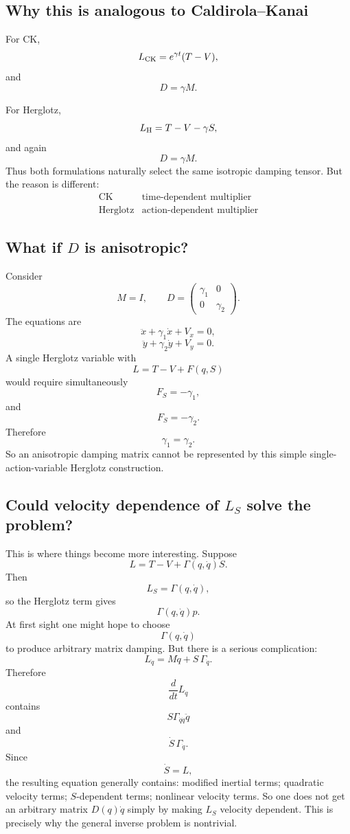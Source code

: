 \subsection{Why this is analogous to Caldirola–Kanai}

For CK,$$ L_{\rm CK} = e^{\gamma t}(T-V), $$
and $$ D=\gamma M. $$

For Herglotz,$$ L_{\rm H} = T-V-\gamma S, $$
and again 
$$ D=\gamma M. $$
Thus both formulations naturally select the same isotropic damping tensor.
But the reason is different:
$$ \boxed{ \begin{array}{c|c} 
\text{CK}& \text{time-dependent multiplier}\\ \hline 
\text{Herglotz}& \text{action-dependent multiplier} 
\end{array}} $$

\subsection{ What if \(D\) is anisotropic?}

Consider
$$ M=I, \qquad D= \begin{pmatrix} \gamma_1&0\\ 0&\gamma_2 \end{pmatrix}. $$
The equations are
$$ \ddot x+\gamma_1\dot x+V_x=0, $$ $$ \ddot y+\gamma_2\dot y+V_y=0. $$
A single Herglotz variable with
$$ L=T-V+F(q,S) $$
would require simultaneously
$$ F_S=-\gamma_1, $$
and
$$ F_S=-\gamma_2. $$
Therefore
$$ \boxed{\gamma_1=\gamma_2.} $$
So an anisotropic damping matrix cannot be represented by this simple single-action-variable Herglotz construction.

\subsection{Could velocity dependence of \(L_S\) solve the problem?}

This is where things become more interesting.
Suppose
\begin{equation}
 \boxed{ L=T-V+\Gamma(q,\dot q)S. } \tag{11} 
\end{equation}
Then
$$ L_S=\Gamma(q,\dot q), $$
so the Herglotz term gives
$$ \Gamma(q,\dot q)p. $$
At first sight one might hope to choose
$$ \Gamma(q,\dot q) $$
to produce arbitrary matrix damping.
But there is a serious complication:
$$ L_{\dot q} = M\dot q + S\,\Gamma_{\dot q}. $$
Therefore
$$ \frac{d}{dt}L_{\dot q} $$
contains
$$ S\Gamma_{\dot q\dot q}\ddot q $$
and
$$ \dot S\,\Gamma_{\dot q}. $$
Since
$$ \dot S=L, $$
the resulting equation generally contains:
modified inertial terms;
quadratic velocity terms;
\(S\)-dependent terms;
nonlinear velocity terms.
So one does not get an arbitrary matrix \(D(q)\dot q\) simply by making \(L_S\) velocity dependent.
This is precisely why the general inverse problem is nontrivial.

